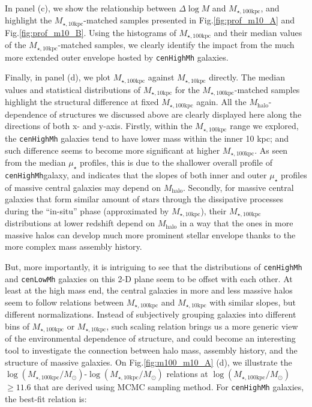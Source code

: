 \documentclass{emulateapj}
\def\rbcg{\texttt{cenHighMh}}
\def\nbcg{\texttt{cenLowMh}}
\def\mhalo{{$M_{\mathrm{halo}}$}}
\def\minn{{$M_{\star,10\mathrm{kpc}}$}}
\def\mtot{{$M_{\star,100\mathrm{kpc}}$}}
\def\logminn{{$\log (M_{\star,10\mathrm{kpc}}/M_{\odot})$}}
\def\logmtot{{$\log (M_{\star,100\mathrm{kpc}}/M_{\odot})$}}
\def\mden{{$\mu_{\star}$}}
\begin{document}
\begin{CJK*}{UTF8}{gbsn}
    In panel (c), we show the relationship between $\Delta \log M$ and \mtot{}, 
    and highlight the \minn{}-matched samples presented in Fig.\ref{fig:prof_m10_A} 
    and Fig.\ref{fig:prof_m10_B}. 
    Using the histograms of \mtot{} and their median values of the \minn{}-matched
    samples, we clearly identify the impact from the much more extended outer envelope 
    hosted by \rbcg{} galaxies.
    
    Finally, in panel (d), we plot \mtot{} against \minn{} directly.  
    The median values and statistical distributions of \minn{} for the \mtot{}-matched 
    samples highlight the structural difference at fixed \mtot{} again.  
    All the \mhalo{}-dependence of structures we discussed above are clearly 
    displayed here along the directions of both x- and y-axis.
    Firstly, within the \mtot{} range we explored, the \rbcg{} galaxies tend to have 
    lower mass within the inner 10 kpc; and such difference seems to become more 
    significant at higher \mtot{}. 
    As seen from the median \mden{} profiles, this is due to the shallower overall
    profile of \rbcg galaxy, and indicates that the slopes of both inner and outer
    \mden{} profiles of massive central galaxies may depend on \mhalo{}. 
    Secondly, for massive central galaxies that form similar amount of stars through
    the dissipative processes during the ``in-situ'' phase (approximated by \minn{}), 
    their \mtot{} distributions at lower redshift depend on \mhalo{} in a way that the
    ones in more massive halos can develop much more prominent stellar envelope thanks 
    to the more complex mass assembly history. 
      
    But, more importantly, it is intriguing to see that the distributions of \rbcg{} and
    \nbcg{} galaxies on this 2-D plane seem to be offset with each other. 
    At least at the high mass end, the central galaxies in more and less massive halos 
    seem to follow relations between \mtot{} and \minn{} with similar slopes, but 
    different normalizations.  
    Instead of subjectively grouping galaxies into different bins of \mtot{} or \minn{}, 
    such scaling relation brings us a more generic view of the environmental 
    dependence of structure, and could become an interesting tool to investigate the 
    connection between halo mass, assembly history, and the structure of massive galaxies.
    On Fig.\ref{fig:m100_m10_A} (d), we illustrate the \logmtot{}-\logminn{} relations 
    at \logmtot$\geq 11.6$ that are derived using MCMC sampling method.  
    For \rbcg{} galaxies, the best-fit relation is:
    

\end{CJK*}
\end{document}
